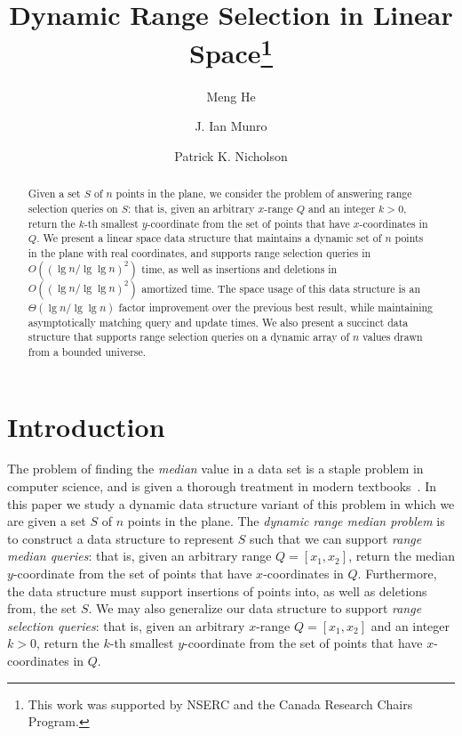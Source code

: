 \documentclass{llncs}
\begin{document}
\title{Dynamic Range Selection in Linear Space\thanks{This work was
    supported by NSERC and the Canada Research Chairs Program.}}

\author{Meng He \and J. Ian Munro \and Patrick K. Nicholson}


\maketitle
\begin{abstract}
  Given a set $S$ of $n$ points in the plane, we consider the problem
  of answering range selection queries on $S$: that is, given an
  arbitrary $x$-range $Q$ and an integer $k > 0$, return the $k$-th
  smallest $y$-coordinate from the set of points that have
  $x$-coordinates in $Q$. We present a linear space data structure
  that maintains a dynamic set of $n$ points in the plane with real
  coordinates, and supports range selection queries in $O((\lg n / \lg
  \lg n)^2)$ time, as well as insertions and deletions in $O((\lg n /
  \lg \lg n)^2)$ amortized time.  The space usage of this data
  structure is an $\Theta(\lg n / \lg \lg n)$ factor improvement over
  the previous best result, while maintaining asymptotically matching
  query and update times.  We also present a succinct data structure
  that supports range selection queries on a dynamic array of $n$
  values drawn from a bounded universe.
\end{abstract}


\section{Introduction}

The problem of finding the \emph{median} value in a data set is a
staple problem in computer science, and is given a thorough treatment
in modern textbooks~\cite{CSRL01}.  In this paper we study a dynamic
data structure variant of this problem in which we are given a set $S$
of $n$ points in the plane.  The \emph{dynamic range median problem}
is to construct a data structure to represent $S$ such that we can
support \emph{range median queries}: that is, given an arbitrary range $Q
= [x_1,x_2]$, return the median $y$-coordinate from the set of points
that have $x$-coordinates in $Q$.  Furthermore, the data structure
must support insertions of points into, as well as deletions from, the
set $S$.  We may also generalize our data structure to support
\emph{range selection queries}: that is, given an arbitrary $x$-range $Q
= [x_1,x_2]$ and an integer $k > 0$, return the $k$-th smallest
$y$-coordinate from the set of points that have $x$-coordinates in
$Q$.
\end{document}
